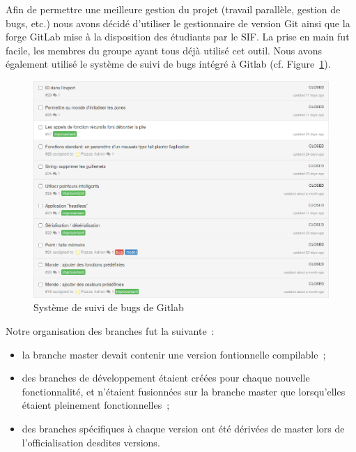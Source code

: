 Afin de permettre une meilleure gestion du projet (travail parallèle, gestion de bugs, etc.) nous avons décidé d'utiliser le gestionnaire de version Git ainsi que la forge GitLab mise à la disposition des étudiants par le SIF.
La prise en main fut facile, les membres du groupe ayant tous déjà utilisé cet outil. Nous avons également utilisé le système de suivi de bugs intégré à Gitlab (cf. Figure~\ref{bugs}).

\begin{figure}[h]
\centering
\includegraphics[scale=0.35]{doc/gestionProjet/bugs.png}
\caption{\label{bugs} Système de suivi de bugs de Gitlab}
\end{figure}



Notre organisation des branches fut la suivante~:
\begin{itemize}
\item la branche master devait contenir une version fontionnelle compilable~;
\item des branches de développement étaient créées pour chaque nouvelle fonctionnalité, et n'étaient fusionnées sur la branche master que lorsqu'elles étaient pleinement fonctionnelles~;
\item des branches spécifiques à chaque version ont été dérivées de master lors de l'officialisation desdites versions.
\end{itemize}

